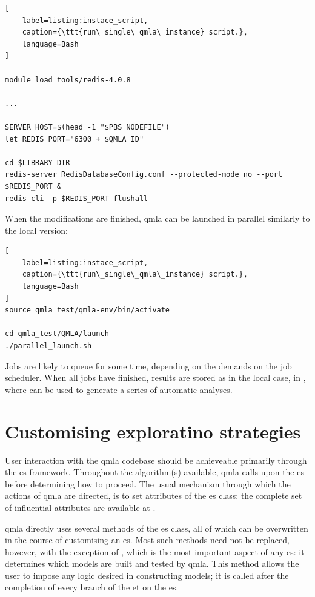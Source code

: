 \begin{lstlisting}[
    label=listing:instace_script,
    caption={\ttt{run\_single\_qmla\_instance} script.},
    language=Bash
]

module load tools/redis-4.0.8

... 

SERVER_HOST=$(head -1 "$PBS_NODEFILE")
let REDIS_PORT="6300 + $QMLA_ID"

cd $LIBRARY_DIR
redis-server RedisDatabaseConfig.conf --protected-mode no --port $REDIS_PORT & 
redis-cli -p $REDIS_PORT flushall

\end{lstlisting}

When the modifications are finished, 
    \gls{qmla} can be launched in parallel similarly to the local version: 

\begin{lstlisting}[
    label=listing:instace_script,
    caption={\ttt{run\_single\_qmla\_instance} script.},
    language=Bash
]
source qmla_test/qmla-env/bin/activate

cd qmla_test/QMLA/launch
./parallel_launch.sh

\end{lstlisting}
\par 

Jobs are likely to queue for some time, depending on the demands on the job scheduler. 
When all jobs have finished, results are stored as in the local case, 
    in ,
    where  can be used to generate a series of automatic analyses. 
\par 

\section{Customising exploratino strategies}
User interaction with the \gls{qmla} codebase should be achieveable primarily through the \acrfull{es} framework. 
Throughout the algorithm(s) available, \gls{qmla} calls upon the \gls{es} before determining how to proceed. 
The usual mechanism through which the actions of \gls{qmla} are directed, 
    is to set attributes of the \gls{es} class:
    the complete set of influential attributes are available at \cite{qmla_docs}. 

\par 
\gls{qmla} directly uses several methods of the \gls{es} class, 
    all of which can be overwritten in the course of customising an \gls{es}. 
Most such methods need not be replaced, however, with the exception of , 
    which is the most important aspect of any \gls{es}: 
    it determines which models are built and tested by \gls{qmla}. 
This method allows the user to impose any logic desired in constructing models;
    it is called after the completion of every branch of the  \acrlong{et} on the \gls{es}. 
\par 

